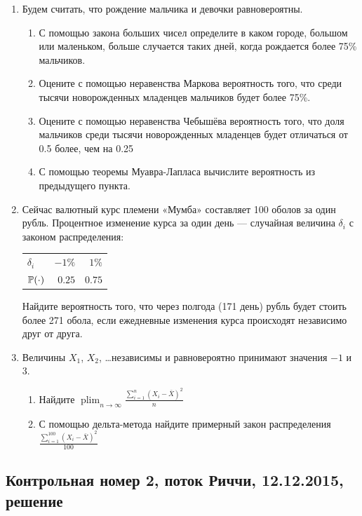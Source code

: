 \documentclass[12pt, a4paper]{article}\usepackage[]{graphicx}\usepackage[]{color}
\DeclareMathOperator*\plim{plim}
\begin{document}
\begin{enumerate}
\item Будем считать, что рождение мальчика и девочки равновероятны.
\begin{enumerate}
\item С помощью закона больших чисел определите в каком городе, большом или маленьком, больше случается таких дней, когда рождается более 75\% мальчиков.
\item Оцените с помощью неравенства Маркова вероятность того, что среди тысячи новорожденных младенцев мальчиков будет более 75\%.
\item Оцените с помощью неравенства Чебышёва вероятность того, что доля мальчиков среди тысячи новорожденных младенцев будет отличаться от 0.5 более, чем на 0.25
\item С помощью теоремы Муавра-Лапласа вычислите вероятность из предыдущего пункта.
\end{enumerate}

\item Сейчас валютный курс племени «Мумба» составляет 100 оболов за один рубль. Процентное изменение курса за один день — случайная величина $\delta_i$ с законом распределения:

\begin{center}
\begin{tabular}{lrr}
\toprule
$\delta_i$ & $-1\%$  & $1\%$ \\
$\P(\cdot)$ & $0.25$  & $0.75$ \\
\bottomrule
\end{tabular}
\end{center}

Найдите вероятность того, что через полгода (171 день) рубль будет стоить более 271 обола, если ежедневные изменения курса происходят независимо друг от друга.

\item Величины $X_1$, $X_2$, \ldots независимы и равновероятно принимают значения $-1$ и $3$.
\begin{enumerate}
\item Найдите $\plim_{n\to\infty} \frac{\sum_{i=1}^n(X_i-\bar X)^2}{n}$
\item С помощью дельта-метода найдите примерный закон распределения $\frac{\sum_{i=1}^{100}(X_i-\bar X)^2}{100}$
\end{enumerate}

\end{enumerate}

\subsection{Контрольная номер 2, поток Риччи, 12.12.2015, решение}
\end{document}
